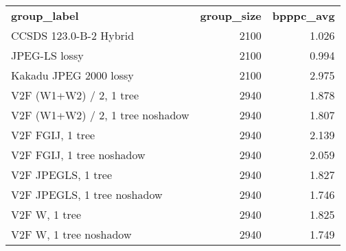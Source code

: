\begin{tabular}{lrr}
\textbf{ group\_label } & \textbf{ group\_size } & \textbf{ bpppc\_avg } \\
CCSDS 123.0-B-2 Hybrid & 2100 & 1.026 \\
JPEG-LS lossy & 2100 & 0.994 \\
Kakadu JPEG 2000 lossy & 2100 & 2.975 \\
V2F (W1+W2) / 2, 1 tree & 2940 & 1.878 \\
V2F (W1+W2) / 2, 1 tree noshadow & 2940 & 1.807 \\
V2F FGIJ, 1 tree & 2940 & 2.139 \\
V2F FGIJ, 1 tree noshadow & 2940 & 2.059 \\
V2F JPEGLS, 1 tree & 2940 & 1.827 \\
V2F JPEGLS, 1 tree noshadow & 2940 & 1.746 \\
V2F W, 1 tree & 2940 & 1.825 \\
V2F W, 1 tree noshadow & 2940 & 1.749 \\
\end{tabular}

